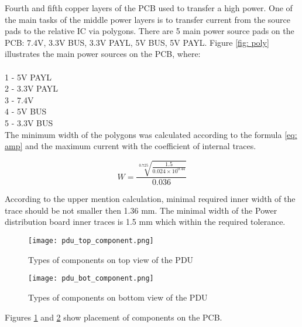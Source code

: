 Fourth and fifth copper layers of the PCB used to transfer a high power. One of the main tasks of the middle power layers is to transfer current from the source pads to the relative IC via polygons. There are 5 main power source pads on the PCB: 7.4V, 3.3V BUS, 3.3V PAYL, 5V BUS, 5V PAYL. Figure \ref{fig: poly} illustrates the main power sources on the PCB, where:\\ \\
 1 - 5V PAYL\\
 2 - 3.3V PAYL\\
 3 - 7.4V\\
 4 - 5V BUS\\
 5  - 3.3V BUS\\

The minimum width of the polygons was calculated according to the formula \ref{eq: amp} and the maximum current with the coefficient of internal traces.

\begin{equation}
W = \frac{\sqrt[0.725]{\frac{1.5}{0.024 \times 10^{0.44}}}}{0.036}
\end{equation} 

According to the upper mention calculation, minimal required inner width of the trace should be not smaller then 1.36 mm. The minimal width of the Power distribution board inner traces is 1.5 mm which within the required tolerance. 



\begin{figure}[h]
	\centering
	\texttt{[image: pdu\_top\_component.png]}
	\caption{Types of components on  top view of the PDU }
	\label{fig: pdu_comp_top}
\end{figure} 

\begin{figure}[h]
	\centering
	\texttt{[image: pdu\_bot\_component.png]}
	\caption{Types of components on  bottom view of the PDU}
	\label{fig: pdu_comp_bot}
\end{figure} 


Figures \ref{fig: pdu_comp_top} and \ref{fig: pdu_comp_bot} show placement of components on the PCB.
 


